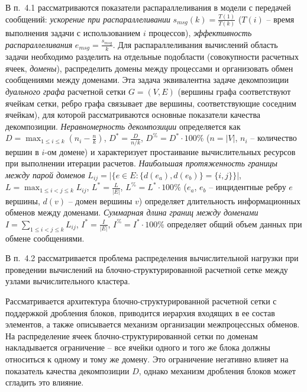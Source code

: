 \documentclass[a4paper,14pt]{extarticle}                     %
\theoremstyle{plain}                                         %
\begin{document}

В п.~4.1 рассматриваются показатели распараллеливания в модели с передачей сообщений: \textit{ускорение при распараллеливании} $s_{msg}(k) = \frac{T(1)}{T(k)}$ ($T(i)$ -- время выполнения задачи с использованием $i$ процессов), \textit{эффективность распараллеливания} $e_{msg} = \frac{s_{msg}}{k}$.
Для распараллеливания вычислений область задачи необходимо разделить на отдельные подобласти (совокупности расчетных ячеек, \textit{домены}), распределить домены между процессами и организовать обмен сообщениями между доменами.
Эта задача эквивалентна задаче декомпозиции \textit{дуального графа} расчетной сетки $G = (V, E)$ (вершины графа соответствуют ячейкам сетки, ребро графа связывает две вершины, соответствующие соседним ячейкам), для которой рассматриваются основные показатели качества декомпозиции.
\textit{Неравномерность декомпозиции} определяется как $D = \max_{1 \le i \le k}{ \left( n_i - \frac{n}{k} \right) }$, $D^{*} = \frac{D}{n / k}$, $D^{\%} = D^{*} \cdot 100\%$ ($n = |V|$, $n_i$ -- количество вершин в $i$-ом домене) и характеризует простаивание вычислительных ресурсов при выполнении итерации расчетов.
\textit{Наибольшая протяженность границы между парой доменов} $L_{ij} = \left| \{ e \in E: \{ d(e_a), d(e_b) \} = \{ i, j \} \} \right|$, $L = \max_{1 \le i < j \le k}{L_{ij}}$, $L^{*} = \frac{L}{|E|}$, $L^{\%} = L^{*} \cdot 100\%$ ($e_a$, $e_b$ -- инцидентные ребру $e$ вершины, $d(v)$ -- домен вершины $v$) определяет длительность информационных обменов между доменами.
\textit{Суммарная длина границ между доменами} $I = \sum_{1 \le i < j \le k}{L_{ij}}$, $I^{*} = \frac{I}{|E|}$, $I^{\%} = I^{*} \cdot 100\%$ определяет общий объем данных при обмене сообщениями.


В п.~4.2 рассматривается проблема распределения вычислительной нагрузки при проведении вычислений на блочно-структурированной расчетной сетке между узлами вычислительного кластера.

Рассматривается архитектура блочно-структурированной расчетной сетки с поддержкой дробления блоков, приводится иерархия входящих в ее состав элементов, а также описывается механизм организации межпроцессных обменов.
На распределение ячеек блочно-структурированной сетки по доменам накладывается ограничение -- все ячейки одного и того же блока должны относиться к одному и тому же домену.
Это ограничение негативно влияет на показатель качества декомпозиции $D$, однако механизм дробления блоков может сгладить это влияние.
\end{document}
